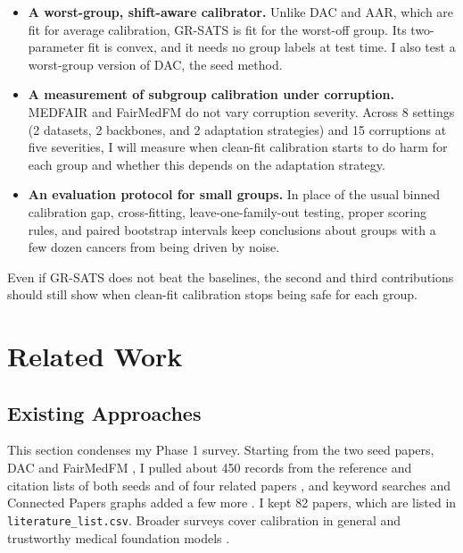 \documentclass[sigconf,nonacm]{acmart}
\begin{document}
\begin{itemize}
  \item \textbf{A worst-group, shift-aware calibrator.} Unlike DAC and AAR, which are fit for average calibration, GR-SATS is fit for the worst-off group. Its two-parameter fit is convex, and it needs no group labels at test time. I also test a worst-group version of DAC, the seed method.
  \item \textbf{A measurement of subgroup calibration under corruption.} MEDFAIR and FairMedFM do not vary corruption severity. Across 8 settings (2 datasets, 2 backbones, and 2 adaptation strategies) and 15 corruptions at five severities, I will measure when clean-fit calibration starts to do harm for each group and whether this depends on the adaptation strategy.
  \item \textbf{An evaluation protocol for small groups.} In place of the usual binned calibration gap, cross-fitting, leave-one-family-out testing, proper scoring rules, and paired bootstrap intervals keep conclusions about groups with a few dozen cancers from being driven by noise.
\end{itemize}

Even if GR-SATS does not beat the baselines, the second and third contributions should still show when clean-fit calibration stops being safe for each group.

\section{Related Work}
\label{sec:related}

\subsection{Existing Approaches}

This section condenses my Phase 1 survey. Starting from the two seed papers, DAC \cite{tomani2023dac} and FairMedFM \cite{jin2024fairmedfm}, I pulled about 450 records from the reference and citation lists of both seeds and of four related papers \cite{tomani2021posthoc,roschewitz2025where,disalvo2024medmnistc,salvador2022faircal}, and keyword searches and Connected Papers graphs added a few more \cite{hekler2023tta,yang2023beyond,tian2024fairdomain}. I kept 82 papers, which are listed in \texttt{literature\_list.csv}. Broader surveys cover calibration in general \cite{wang2023survey} and trustworthy medical foundation models \cite{shi2024survey}.
\end{document}
